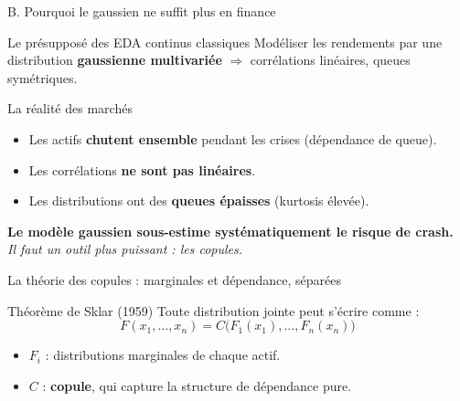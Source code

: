 \documentclass[10pt,aspectratio=169]{beamer}
\begin{document}
\begin{frame}{B. Pourquoi le gaussien ne suffit plus en finance}
\begin{block}{Le présupposé des EDA continus classiques}
Modéliser les rendements par une distribution \textbf{gaussienne multivariée} $\Rightarrow$ corrélations linéaires, queues symétriques.
\end{block}

\vspace{0.3cm}
\begin{alertblock}{La réalité des marchés}
\begin{itemize}
  \item Les actifs \textbf{chutent ensemble} pendant les crises (dépendance de queue).
  \item Les corrélations \textbf{ne sont pas linéaires}.
  \item Les distributions ont des \textbf{queues épaisses} (kurtosis élevée).
\end{itemize}
\end{alertblock}

\vspace{0.3cm}
\centering
\textbf{Le modèle gaussien sous-estime systématiquement le risque de crash.}\\
\textit{Il faut un outil plus puissant : les copules.}
\end{frame}

\begin{frame}{La théorie des copules : marginales et dépendance, séparées}
\begin{block}{Théorème de Sklar (1959)}
Toute distribution jointe peut s'écrire comme :
\[
F(x_1, \ldots, x_n) = C\bigl(F_1(x_1), \ldots, F_n(x_n)\bigr)
\]
\begin{itemize}
  \item $F_i$ : distributions marginales de chaque actif.
  \item $C$ : \textbf{copule}, qui capture la structure de dépendance pure.
\end{itemize}
\end{block}

\vspace{0.2cm}
\centering
{}
\end{frame}
\end{document}
